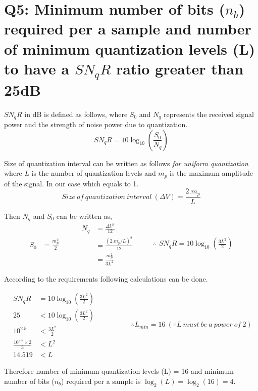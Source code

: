 \documentclass[a4paper,11pt]{article}%
\begin{document}
\pagebreak
\section*{Q5: Minimum number of bits ($n_b$) required per a sample and number of minimum quantization levels (L) to have a $SN_qR$ ratio greater than 25dB}
 
$SN_qR$ in dB is defined as follows, where $S_0$ and $N_q$ represents the received signal power and the strength of noise power due to quantization.
\[
SN_qR = 10\log_{10}\left(\frac{S_0}{N_q}\right)
\]

Size of quantization interval can be written as follows \textit{for uniform quantization} where $L$ is the number of quantization levels and $m_p$ is the maximum amplitude of the signal. In our case which equals to 1.\\


\[Size ~of ~quantization ~interval~ (\Delta V) = \frac{2.m_p}{L}\]

Then $N_q$ and $S_0$ can be written as,
\[
\begin{split}
	S_0 &=\frac{m_p^2}{2}	
\end{split}
\hspace{1cm}
\begin{split}
	N_q &= \frac{\Delta V^2}{12}\\
	&= \frac{(2.m_p/L)^2}{12}\\
	& = \frac{m_p^2}{3L^2}
\end{split}
\hspace{1cm}
\therefore
\begin{split}
		SN_qR = 10\log_{10}\left(\frac{3L^2}{2}\right)
\end{split}
\]

According to the requirements following calculations can be done.

\[
\begin{split}
	SN_qR &= 10\log_{10}\left(\frac{3L^2}{2}\right)\\
	25 &< 10\log_{10}\left(\frac{3L^2}{2}\right)\\
	10^{2.5} &< \frac{3L^2}{2}\\
	\frac{10^{2.5}\times2}{3} &< L^2\\
	14.519 &< L
\end{split}
\hspace{2cm}
\therefore L_{min} = 16 ~(\because L~ must ~be~ a ~power ~of~ 2)
\]

Therefore number of minimum quantization levels (L) = 16 and  minimum number of bits ($n_b$) required per a sample is $\log_{2}(L) = \log_{2}(16) = 4$.
\end{document}
